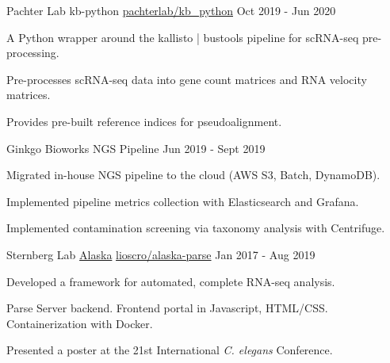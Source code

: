 \begin{cventries}
\cventry
  {Pachter Lab} %
  {kb-python} %
  {\faGithub\phantom{a}\href{https://github.com/pachterlab/kb_python}{pachterlab/kb\_python}} %
  {Oct 2019 - Jun 2020} %
  {
    \begin{cvitems} %
      \item {A Python wrapper around the kallisto | bustools pipeline for scRNA-seq pre-processing.}
      \item {Pre-processes scRNA-seq data into gene count matrices and RNA velocity matrices.}
      \item {Provides pre-built reference indices for pseudoalignment.}
    \end{cvitems}
  }

\cventry
    {Ginkgo Bioworks}
    {NGS Pipeline}
    {}
    {Jun 2019 - Sept 2019}
    {
     \begin{cvitems} %
       \item {Migrated in-house NGS pipeline to the cloud (AWS S3, Batch, DynamoDB).}
       \item {Implemented pipeline metrics collection with Elasticsearch and Grafana.}
       \item {Implemented contamination screening via taxonomy analysis with Centrifuge.}
      \end{cvitems}
    }

\cventry
    {Sternberg Lab}
    {\href{https://github.com/Lioscro/alaska-parse}{Alaska}}
    {\faGithub\phantom{a}\href{https://github.com/Lioscro/alaska-parse}{lioscro/alaska-parse}}
    {Jan 2017 - Aug 2019}
    {
     \begin{cvitems} %
       \item Developed a framework for automated, complete RNA-seq analysis.
       \item Parse Server backend. Frontend portal in Javascript, HTML/CSS. Containerization with Docker.
       \item Presented a poster at the 21st International \textit{C. elegans} Conference.
      \end{cvitems}
    }

\end{cventries}
